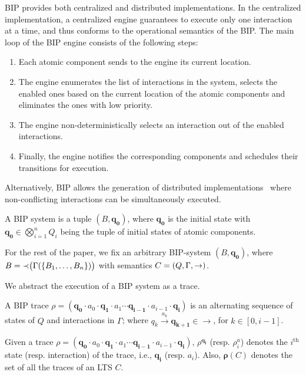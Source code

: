 BIP provides both centralized and distributed implementations. In the centralized implementation,
a centralized engine guarantees to execute only one interaction at a time, and thus conforms to the operational semantics of the BIP.  The main loop of the BIP engine consists of the following steps:
\begin{enumerate}
\item Each atomic component sends to the engine its current
location.
\item The engine enumerates the list of interactions in the system,
selects the enabled ones based on the current location
of the atomic components and eliminates the ones
with low priority.
\item The engine non-deterministically selects an interaction
out of the enabled interactions.
\item Finally, the engine notifies the corresponding components
and schedules their transitions for execution.
\end{enumerate}

Alternatively, BIP allows the generation of distributed
implementations~\cite{bip-distributed} where non-conflicting interactions
can be simultaneously executed.

\begin{definition}
\label{def:bipsystem}
A BIP system is a tuple $(B,  \bm{q_0})$, where $ \bm{q_0}$ is the initial state with $ \bm{q_0} \in \bigotimes_{i=1}^n Q_i$ being the tuple of initial states of atomic components.
\end{definition}


For the rest of the paper, we fix an arbitrary BIP-system $(B,  \bm{q_0})$, where  $B = \mathit{\prec}\big(\Gamma(\{B_1, \ldots, B_n\})\big)$ with semantics $C = (Q, \Gamma, \stackrel{}{\rightarrow})$.

We abstract the execution of a BIP system as a trace.
%
\begin{definition}
\label{def:trace-global}
A BIP trace $\rho = ( \bm{q_0} \cdot a_0 \cdot  \bm{q_1} \cdot a_1 \cdots  \bm{q_{i-1}} \cdot a_{i-1} \cdot  \bm{q_i})$ is an alternating sequence of states of $Q$ and interactions in $\Gamma$; where $q_k \xrightarrow{a_k}  \bm{q_{k+1}} \in \rightarrow$, for $k \in [0, i-1]$.
\end{definition}

Given a trace $\rho = ( \bm{q_0} \cdot a_0 \cdot  \bm{q_1} \cdot a_1 \cdots  \bm{q_{i-1}} \cdot a_{i-1} \cdot  \bm{q_i})$, 
$\rho^{ \bm{q_i}}$ (resp. $\rho^a_i$) denotes the $i^\text{th}$ state (resp. interaction) of the trace, i.e., $ \bm{q_i}$ (resp. $a_i$). Also, $\bm{\rho}(C)$ denotes the set of all the traces of an LTS $C$. 
